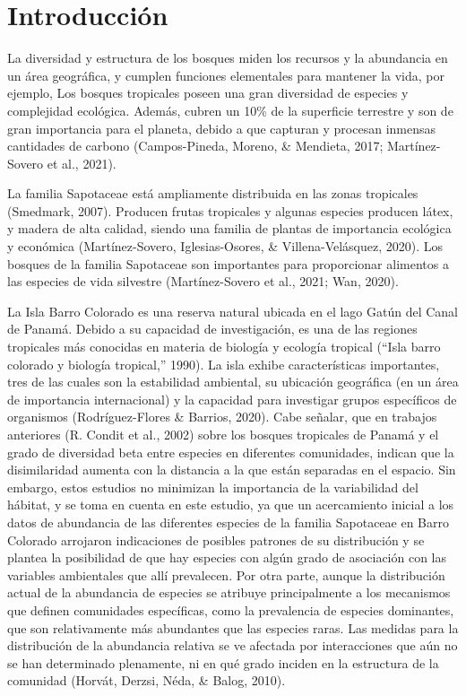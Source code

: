 \documentclass[11pt,]{article}
\begin{document}
\vskip 6.5pt


\noindent  \section{Introducción}\label{introducciuxf3n}

La diversidad y estructura de los bosques miden los recursos y la
abundancia en un área geográfica, y cumplen funciones elementales para
mantener la vida, por ejemplo, Los bosques tropicales poseen una gran
diversidad de especies y complejidad ecológica. Además, cubren un 10\%
de la superficie terrestre y son de gran importancia para el planeta,
debido a que capturan y procesan inmensas cantidades de carbono
(Campos-Pineda, Moreno, \& Mendieta, 2017; Martínez-Sovero et al.,
2021).

La familia Sapotaceae está ampliamente distribuida en las zonas
tropicales (Smedmark, 2007). Producen frutas tropicales y algunas
especies producen látex, y madera de alta calidad, siendo una familia de
plantas de importancia ecológica y económica (Martínez-Sovero,
Iglesias-Osores, \& Villena-Velásquez, 2020). Los bosques de la familia
Sapotaceae son importantes para proporcionar alimentos a las especies de
vida silvestre (Martínez-Sovero et al., 2021; Wan, 2020).

La Isla Barro Colorado es una reserva natural ubicada en el lago Gatún
del Canal de Panamá. Debido a su capacidad de investigación, es una de
las regiones tropicales más conocidas en materia de biología y ecología
tropical (``Isla barro colorado y biología tropical,'' 1990). La isla
exhibe características importantes, tres de las cuales son la
estabilidad ambiental, su ubicación geográfica (en un área de
importancia internacional) y la capacidad para investigar grupos
específicos de organismos (Rodríguez-Flores \& Barrios, 2020). Cabe
señalar, que en trabajos anteriores (R. Condit et al., 2002) sobre los
bosques tropicales de Panamá y el grado de diversidad beta entre
especies en diferentes comunidades, indican que la disimilaridad aumenta
con la distancia a la que están separadas en el espacio. Sin embargo,
estos estudios no minimizan la importancia de la variabilidad del
hábitat, y se toma en cuenta en este estudio, ya que un acercamiento
inicial a los datos de abundancia de las diferentes especies de la
familia Sapotaceae en Barro Colorado arrojaron indicaciones de posibles
patrones de su distribución y se plantea la posibilidad de que hay
especies con algún grado de asociación con las variables ambientales que
allí prevalecen. Por otra parte, aunque la distribución actual de la
abundancia de especies se atribuye principalmente a los mecanismos que
definen comunidades específicas, como la prevalencia de especies
dominantes, que son relativamente más abundantes que las especies raras.
Las medidas para la distribución de la abundancia relativa se ve
afectada por interacciones que aún no se han determinado plenamente, ni
en qué grado inciden en la estructura de la comunidad (Horvát, Derzsi,
Néda, \& Balog, 2010).
\end{document}
